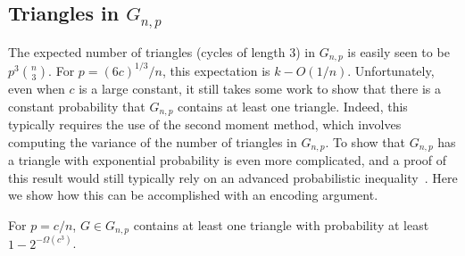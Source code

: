 \documentclass{patmorin}
\begin{document}
\subsection{Triangles in $G_{n,p}$}

The expected number of triangles (cycles of length 3) in $G_{n,p}$ is
easily seen to be $p^3\binom{n}{3}$.  For $p=(6c)^{1/3}/n$, this
expectation is $k-O(1/n)$.  Unfortunately, even when $c$ is a large
constant, it still takes some work to show that there is a constant
probability that $G_{n,p}$ contains at least one triangle. Indeed,
this typically requires the use of the second moment method, which
involves computing the variance of the number of triangles in
$G_{n,p}$. To show that $G_{n, p}$ has a triangle with exponential
probability is even more complicated, and a proof of this result would
still typically rely on an advanced probabilistic
inequality~\cite{alon:probabilistic}. Here we show how this can be
accomplished with an encoding argument.

\begin{thm}
  For $p=c/n$, $G \in G_{n,p}$ contains at least one triangle with
  probability at least $1-2^{-\Omega(c^3)}$.
\end{thm}
\end{document}
